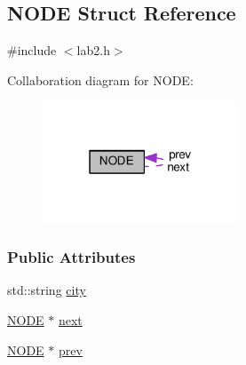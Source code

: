 \hypertarget{structNODE}{\subsection{N\+O\+D\+E Struct Reference}
\label{structNODE}
}


{\ttfamily \#include $<$lab2.\+h$>$}



Collaboration diagram for N\+O\+D\+E\+:\nopagebreak
\begin{figure}[H]
\begin{center}
\leavevmode
\includegraphics[width=166pt]{structNODE__coll__graph}
\end{center}
\end{figure}
\subsubsection*{Public Attributes}
\begin{DoxyCompactItemize}
\item 
std\+::string \hyperlink{structNODE_a76c9a9603778b363e65bfe84da4bd72e}{city}
\item 
\hyperlink{structNODE}{N\+O\+D\+E} $\ast$ \hyperlink{structNODE_a078472e8ab2d2fe38e052f5c2a425618}{next}
\item 
\hyperlink{structNODE}{N\+O\+D\+E} $\ast$ \hyperlink{structNODE_ab92c64b5b2039998bbf32e9ed3bd55ef}{prev}
\end{DoxyCompactItemize}


